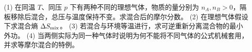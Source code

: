 (1) 在同温 \(T\)、同压 \(p\) 下有两种不同的理想气体，物质的量分别为 \(n_A,n_B>0\)，隔板移除后混合，总压与温度保持不变。求混合后的摩尔分数。
(2) 在理想气体假设下求混合熵 \(\Delta S_{\rm mix}\)。
(3) 若混合与环境等温进行，求可逆重新分离混合物的最小外功。
(4) 当两侧实际为同一种气体时说明为何不能将不同气体的公式机械套用，并求等摩尔混合的特例。
